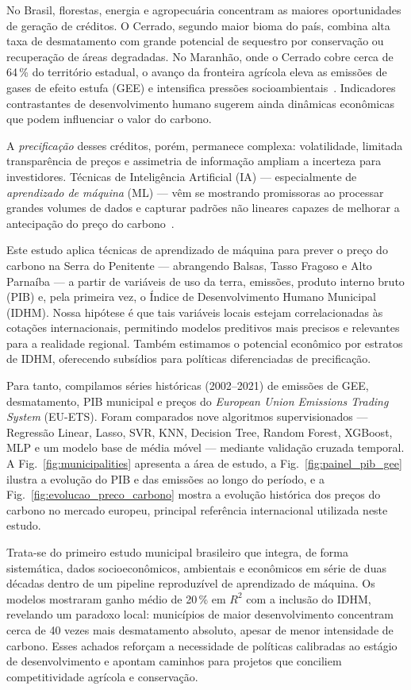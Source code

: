 \documentclass[conference]{IEEEtran}
\begin{document}
No Brasil, florestas, energia e agropecuária concentram as maiores oportunidades de geração de créditos. O Cerrado, segundo maior bioma do país, combina alta taxa de desmatamento com grande potencial de sequestro por conservação ou recuperação de áreas degradadas. No Maranhão, onde o Cerrado cobre cerca de 64\,\% do território estadual, o avanço da fronteira agrícola eleva as emissões de gases de efeito estufa (GEE) e intensifica pressões socioambientais~\cite{cerradoRelat2024}. Indicadores contrastantes de desenvolvimento humano sugerem ainda dinâmicas econômicas que podem influenciar o valor do carbono.

A \emph{precificação} desses créditos, porém, permanece complexa: volatilidade, limitada transparência de preços e assimetria de informação ampliam a incerteza para investidores. Técnicas de Inteligência Artificial (IA) — especialmente de \emph{aprendizado de máquina} (ML) — vêm se mostrando promissoras ao processar grandes volumes de dados e capturar padrões não lineares capazes de melhorar a antecipação do preço do carbono~\cite{zhou2019}.

Este estudo aplica técnicas de aprendizado de máquina para prever o preço do carbono na Serra do Penitente — abrangendo Balsas, Tasso Fragoso e Alto Parnaíba — a partir de variáveis de uso da terra, emissões, produto interno bruto (PIB) e, pela primeira vez, o Índice de Desenvolvimento Humano Municipal (IDHM). Nossa hipótese é que tais variáveis locais estejam correlacionadas às cotações internacionais, permitindo modelos preditivos mais precisos e relevantes para a realidade regional. Também estimamos o potencial econômico por estratos de IDHM, oferecendo subsídios para políticas diferenciadas de precificação.

Para tanto, compilamos séries históricas (2002–2021) de emissões de GEE, desmatamento, PIB municipal e preços do \emph{European Union Emissions Trading System} (EU-ETS). Foram comparados nove algoritmos supervisionados — Regressão Linear, Lasso, SVR, KNN, Decision Tree, Random Forest, XGBoost, MLP e um modelo base de média móvel — mediante validação cruzada temporal. A Fig.~\ref{fig:municipalities} apresenta a área de estudo, a Fig.~\ref{fig:painel_pib_gee} ilustra a evolução do PIB e das emissões ao longo do período, e a Fig.~\ref{fig:evolucao_preco_carbono} mostra a evolução histórica dos preços do carbono no mercado europeu, principal referência internacional utilizada neste estudo.

Trata-se do primeiro estudo municipal brasileiro que integra, de forma sistemática, dados socioeconômicos, ambientais e econômicos em série de duas décadas dentro de um pipeline reproduzível de aprendizado de máquina. Os modelos mostraram ganho médio de 20\,\% em $R^{2}$ com a inclusão do IDHM, revelando um paradoxo local: municípios de maior desenvolvimento concentram cerca de 40 vezes mais desmatamento absoluto, apesar de menor intensidade de carbono. Esses achados reforçam a necessidade de políticas calibradas ao estágio de desenvolvimento e apontam caminhos para projetos que conciliem competitividade agrícola e conservação.
\end{document}

